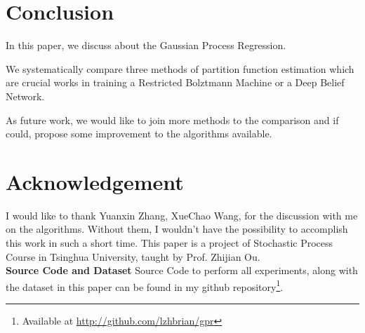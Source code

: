 \documentclass{sig-alternate-05-2015}
\newcommand{\para}[1]{{\vspace{2pt} \bf \noindent #1 \hspace{8pt}}}
\begin{document}











\section{Conclusion} \label{sec:conclusion}
In this paper, we discuss about the Gaussian Process Regression.

We systematically compare three methods of partition function estimation which are crucial works in training a Restricted Bolztmann Machine or a Deep Belief Network. 

As future work, we would like to join more methods to the comparison and if could, propose some improvement to the algorithms available.




\renewcommand{\baselinestretch}{1.1}
\balance
\section{Acknowledgement} \label{sec:acknowledgement}
I would like to thank Yuanxin Zhang, XueChao Wang, for the discussion with me on the algorithms. Without them, I wouldn't have the possibility to accomplish this work in such a short time. This paper is a project of Stochastic Process Course in Tsinghua University, taught by Prof. Zhijian Ou.\\


\para{Source Code and Dataset} Source Code to perform all experiments, along with the dataset in this paper can be found in my github repository\footnote{Available at \color{blue}\href{http://github.com/lzhbrian/gpr}{http://github.com/lzhbrian/gpr}}.


\newpage


\end{document}
